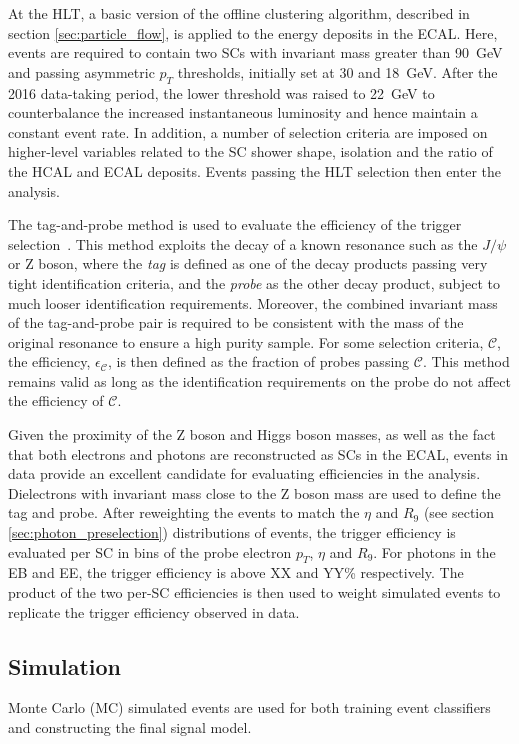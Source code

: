 At the HLT, a basic version of the offline clustering algorithm, described in section \ref{sec:particle_flow}, is applied to the energy deposits in the ECAL. Here, events are required to contain two SCs with invariant mass greater than 90~GeV and passing asymmetric $p_T$ thresholds, initially set at 30 and 18~GeV. After the 2016 data-taking period, the lower threshold was raised to 22~GeV to counterbalance the increased instantaneous luminosity and hence maintain a constant event rate. In addition, a number of selection criteria are imposed on higher-level variables related to the SC shower shape, isolation and the ratio of the HCAL and ECAL deposits. Events passing the HLT selection then enter the \Hgg analysis.

The tag-and-probe method is used to evaluate the efficiency of the trigger selection~\cite{CMS:2011aa}. This method exploits the decay of a known resonance such as the $J/\psi$ or Z boson, where the \textit{tag} is defined as one of the decay products passing very tight identification criteria, and the \textit{probe} as the other decay product, subject to much looser identification requirements. Moreover, the combined invariant mass of the tag-and-probe pair is required to be consistent with the mass of the original resonance to ensure a high purity sample. For some selection criteria, $\mathcal{C}$, the efficiency, $\epsilon_{\mathcal{C}}$, is then defined as the fraction of probes passing $\mathcal{C}$. This method remains valid as long as the identification requirements on the probe do not affect the efficiency of $\mathcal{C}$.

Given the proximity of the Z boson and Higgs boson masses, as well as the fact that both electrons and photons are reconstructed as SCs in the ECAL, \Zee events in data provide an excellent candidate for evaluating efficiencies in the \Hgg analysis. Dielectrons with invariant mass close to the Z boson mass are used to define the tag and probe. After reweighting the \Zee events to match the $\eta$ and $R_9$ (see section \ref{sec:photon_preselection}) distributions of \Hgg events, the trigger efficiency is evaluated per SC in bins of the probe electron $p_T$, $\eta$ and $R_9$. For photons in the EB and EE, the trigger efficiency is above XX and YY\% respectively. The product of the two per-SC efficiencies is then used to weight simulated events to replicate the trigger efficiency observed in data.

\subsection{Simulation}
Monte Carlo (MC) simulated events are used for both training event classifiers and constructing the final signal model. 

